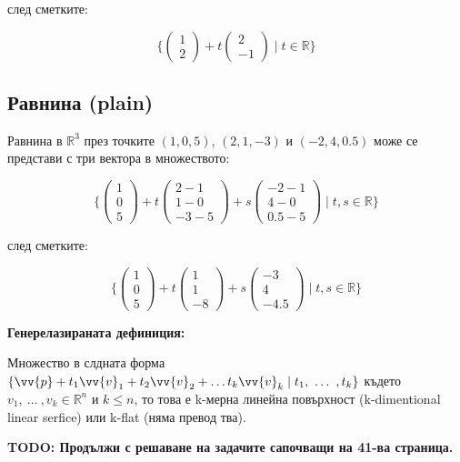 \documentclass[12pt]{article}
\begin{document}
\noindent след сметките:

\begin{equation*}
    \{ \left(\begin{array}{ c } 1 \\ 2 \end{array}\right) + t \left(\begin{array}{ c } 2 \\ -1 \end{array}\right) \mid t \in \mathbb{R} \}
\end{equation*}

\subsection{Равнина (plain)}

\noindent Равнина в $ \mathbb{R}^3 $ през точките $(1,0,5)$, $(2,1,-3)$ и $(-2, 4, 0.5)$ може се представи с три вектора в множеството:

\begin{equation*}
    \{ \left(\begin{array}{ c } 1 \\ 0 \\ 5 \end{array}\right) + t \left(\begin{array}{ c } 2 - 1 \\ 1 - 0 \\ -3 - 5 \end{array}\right) + s \left(\begin{array}{ c } -2 - 1 \\ 4 - 0 \\ 0.5 - 5 \end{array}\right) \mid t, s \in \mathbb{R} \}
\end{equation*}

\noindent след сметките:

\begin{equation*}
    \{ \left(\begin{array}{ c } 1 \\ 0 \\ 5 \end{array}\right) + t \left(\begin{array}{ c } 1 \\ 1 \\ -8 \end{array}\right) + s \left(\begin{array}{ c } -3 \\ 4 \\ -4.5 \end{array}\right) \mid t, s \in \mathbb{R} \}
\end{equation*}

\noindent \textbf{Генерелазираната дефиниция:}

\noindent Множество в слдната форма $ \{ \vv{p} + t_{1}\vv{v}_{1} + t_{2}\vv{v}_{2} + \ldots t_{k}\vv{v}_{k} \mid t_{1},\ \ldots\ , t_{k} \}$ където $ v_{1},\ \ldots\ , v_{k} \in \mathbb{R}^n $ и $ k \leq n $, то това е k-мерна линейна повърхност (k-dimentional linear serfice) или k-flat (няма превод тва).

\textbf{
    TODO: Продължи с решаване на задачите сапочващи на 41-ва страница.
}
\end{document}
